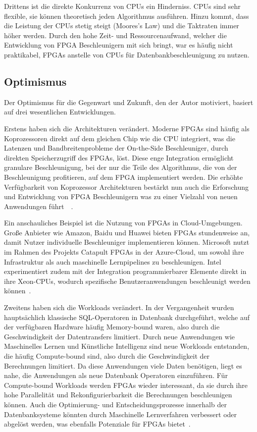 \documentclass[conference]{IEEEtran}
\begin{document}
Drittens ist die direkte Konkurrenz von CPUs ein Hinderniss. CPUs sind sehr flexible, sie können theoretisch jeden Algorithmus
ausführen. Hinzu kommt, dass die Leistung der CPUs stetig steigt (Moores's Law) und die Taktraten immer höher werden. Durch den hohe
Zeit- und Ressourcenaufwand, welcher die Entwicklung von FPGA Beschleunigern mit sich bringt, war es häufig nicht praktikabel, FPGAs
anstelle von CPUs für Datenbankbeschleunigung zu nutzen.

\subsection{Optimismus}
Der Optimismus für die Gegenwart und Zukunft, den der Autor motiviert, basiert auf drei wesentlichen Entwicklungen.

Erstens haben sich die Architekturen verändert. Moderne FPGAs sind häufig als Koprozessoren direkt auf dem gleichen Chip wie die CPU integriert,
was die Latenzen und Bandbreitenprobleme der On-the-Side Beschleuniger, durch direkten Speicherzugriff des FPGAs, löst.
Diese enge Integration ermöglicht granulare Beschleunigung, bei der nur die Teile des Algorithmus, die von der Beschleunigung profitieren,
auf dem FPGA implementiert werden. Die erhöhte Verfügbarkeit von Koprozessor Architekturen bestärkt nun auch die Erforschung und Entwicklung
von FPGA Beschleunigern was zu einer Vielzahl von neuen Anwendungen führt~\cite{lisa_column_2018}~\cite{sidler_accelerating_2017}.

Ein anschauliches Beispiel ist die Nutzung von FPGAs in Cloud-Umgebungen. Große Anbieter wie Amazon, Baidu und Huawei bieten FPGAs stundenweise an,
damit Nutzer individuelle Beschleuniger implementieren können. Microsoft nutzt im Rahmen des Projekts Catapult FPGAs in der Azure-Cloud, um sowohl ihre
Infrastruktur als auch maschinelle Lernpipelines zu beschleunigen. Intel experimentiert zudem mit der Integration programmierbarer Elemente direkt in
ihre Xeon-CPUs, wodurch spezifische Benutzeranwendungen beschleunigt werden können~\cite{istvan_glass_2019}.


Zweitens haben sich die Workloads verändert. In der Vergangenheit wurden hauptsächlich klassische SQL-Operatoren
in Datenbank durchgeführt, welche auf der verfügbaren Hardware häufig Memory-bound waren, also durch die
Geschwindigkeit der Datentransfers limitiert. Durch neue Anwendungen wie Maschinelles Lernen und Künstliche Intelligenz
sind neue Workloads entstanden, die häufig Compute-bound sind, also durch die Geschwindigkeit der Berechnungen limitiert. Da diese Anwendungen viele Daten benötigen,
liegt es nahe, die Anwendungen als neue Datenbank Operatoren einzuführen. Für Compute-bound Workloads werden FPGAs wieder interessant, da sie durch ihre
hohe Parallelität und Rekonfigurierbarkeit die Berechnungen beschleunigen können.
Auch die Optimierung- und Entscheidungsprozesse innerhalb der Datenbanksysteme könnten durch Maschinelle Lernverfahren verbessert oder abgelöst werden, was ebenfalls
Potenziale für FPGAs bietet~\cite{istvan_glass_2019}.
\end{document}
